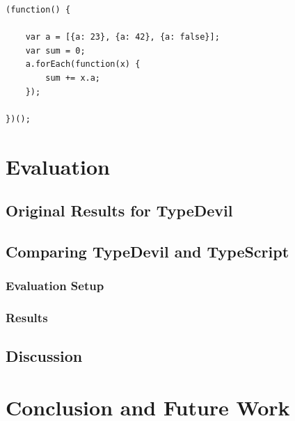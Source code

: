 \documentclass[runningheads,a4paper]{llncs}
\begin{document}
\medskip\medskip
\lstset{language=javascript}
\begin{minipage}{\linewidth}
\begin{lstlisting}[frame=single, caption=inconsistent\_foreach.js, label=listingForEach]
(function() {
    
    var a = [{a: 23}, {a: 42}, {a: false}];
    var sum = 0;
    a.forEach(function(x) {
        sum += x.a;
    });
    
})();
\end{lstlisting}
\end{minipage}



\section{Evaluation}

\subsection{Original Results for TypeDevil}

\subsection{Comparing TypeDevil and TypeScript} \label{comparison}

\subsubsection{Evaluation Setup}

\subsubsection{Results}


\subsection{Discussion}



\section{Conclusion and Future Work}


{}

\end{document}
